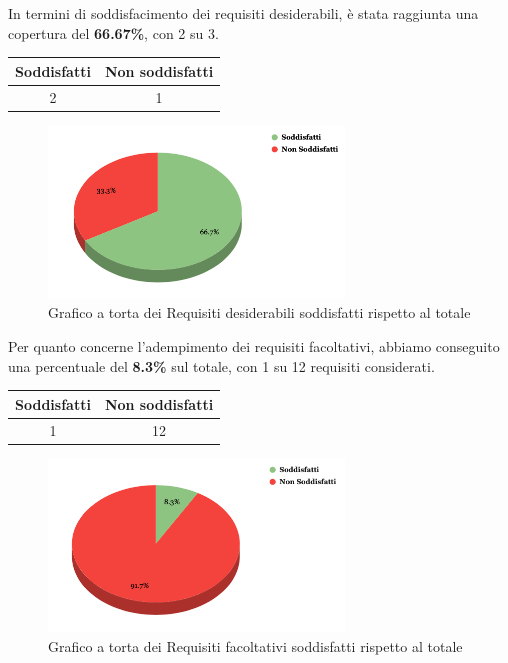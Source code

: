 In termini di soddisfacimento dei requisiti desiderabili, è stata raggiunta una copertura del \textbf{66.67\%}, con 2 su 3.
\begin{center}
\begin{tabular}{|c|c|}
\hline
\textbf{Soddisfatti} & \textbf{Non soddisfatti} \\
\hline
2 & 1 \\
\hline
\end{tabular}
\end{center}

\begin{figure}[H]
    \centering
    \includegraphics[width=0.7\textwidth]{img/RequisitiDesiderabili.png}
    \caption{Grafico a torta dei Requisiti desiderabili soddisfatti rispetto al totale}
\end{figure}
\newpage

Per quanto concerne l’adempimento dei requisiti facoltativi, abbiamo conseguito una percentuale del \textbf{8.3\%} sul totale, con 1 su 12 requisiti considerati.
\begin{center}
    \begin{tabular}{|c|c|}
    \hline
    \textbf{Soddisfatti} & \textbf{Non soddisfatti} \\
    \hline
    1 & 12 \\
    \hline
    \end{tabular}
    \end{center}

    \begin{figure}[H]
        \centering
        \includegraphics[width=0.7\textwidth]{img/RequisitiFacoltativi.png}
        \caption{Grafico a torta dei Requisiti facoltativi soddisfatti rispetto al totale}
    \end{figure}
